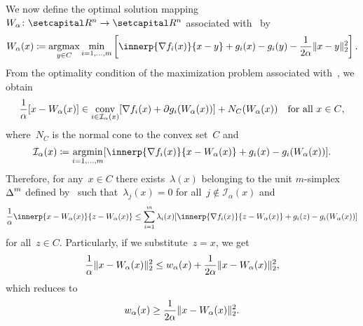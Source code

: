 \documentclass[../../main]{subfiles}
\begin{document}
We now define the optimal solution mapping~$W_\alpha \colon \setR^n \to \setR^n$ associated with~ by
\begin{equation} \label{eq:reg_lin_gap_MO_sol}
    W_\alpha(x) \coloneqq \argmax_{y \in C} \min_{i = 1, \dots, m} \left[ \innerp{\nabla f_i(x)}{x - y} + g_i(x) - g_i(y) - \frac{1}{2 \alpha} \norm{x - y}_2^2 \right]
    .\end{equation}
From the optimality condition of the maximization problem associated with~, we obtain
\begin{equation}
    \frac{1}{\alpha} [x - W_\alpha(x)] \in \operatorname*{conv}_{i \in \mathcal{I}_\alpha(x)} [ \nabla f_i(x) + \partial g_i(W_\alpha(x)) ] + N_C(W_\alpha(x)) \quad \text{for all~$x \in C$}
    ,\end{equation}
where~$N_C$ is the normal cone to the convex set~$C$ and
\begin{equation} \label{eq:reg_lin_gap_MO_active}
    \mathcal{I}_\alpha(x) \coloneqq \argmin_{i = 1, \dots, m} [\innerp{\nabla f_i(x)}{x - W_\alpha(x)} + g_i(x) - g_i(W_\alpha(x))]
    .\end{equation}
Therefore, for any~$x \in C$ there exists~$\lambda(x)$ belonging to the unit $m$-simplex~$\operatorname{\Delta}^m$ defined by~ such that~$\lambda_j(x) = 0$ for all~$j \notin \mathcal{I}_\alpha(x)$ and
\begin{equation} \label{eq:reg_lin_gap_optimality}
    \frac{1}{\alpha} \innerp{x - W_\alpha(x)}{z - W_\alpha(x)} \le \sum_{i = 1}^{m} \lambda_i(x) [\innerp{\nabla f_i(x)}{z - W_\alpha(x)} + g_i(z) - g_i(W_\alpha(x))]
\end{equation}
for all~$z \in C$.
Particularly, if we substitute~$z = x$, we get
\begin{equation}
    \frac{1}{\alpha} \lVert x - W_\alpha(x)\rVert_2^2 \le w_\alpha(x) + \frac{1}{2 \alpha} \lVert x - W_\alpha(x)\rVert_2^2
    ,\end{equation}
which reduces to
\begin{equation} \label{eq:reg_lin_gap_MO_LB}
    w_\alpha(x) \ge \frac{1}{2 \alpha} \lVert x - W_\alpha(x)\rVert_2^2
    .\end{equation}
\end{document}

